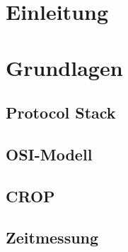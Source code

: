\documentclass[
    11pt, %
    DIV=11,
    ngerman, %
    a4paper, %
    oneside, %
    titlepage, %
    parskip=half, %
    headings=normal, %
    listof=totoc, %
    bibliography=totoc, %
    bibliographyWebverzeichnis=totoc,
    index=totoc, %
    captions=tableheading, %
    final %
]{scrreprt}
\begin{document}
\setcounter{secnumdepth}{3}
\setcounter{tocdepth}{3}

\ofoot{}



\ofoot{\pagemark}
\tableofcontents %


\clearpage\markboth{\nomname}{\nomname} 
\printnomenclature
\printindex
\label{sec:Glossar}

\listoffigures %
\listoftables %
\renewcommand{\lstlistlistingname}{Verzeichnis der Listings}
\lstlistoflistings %

\clearpage
{}

\chapter{Einleitung}
	

\chapter{Grundlagen}
	
	\section{Protocol Stack}
		
	\section{OSI-Modell}
		
	\section{CROP}
		
	\section{Zeitmessung} 
		
	
\end{document}

